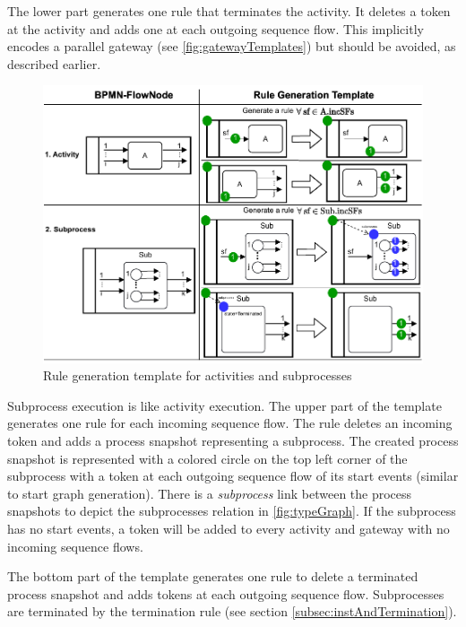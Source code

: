 \documentclass[runningheads]{lmcs}
\begin{document}
The lower part generates one rule that terminates the activity.
It deletes a token at the activity and adds one at each outgoing sequence flow.
This implicitly encodes a parallel gateway (see \autoref{fig:gatewayTemplates}) but should be avoided, as described earlier. 

\begin{figure}[ht]
    \centering
    \includegraphics[width=1\textwidth]{images/activities_template.pdf}
    \caption{Rule generation template for activities and subprocesses}
    \label{fig:activityTemplates}
\end{figure}

Subprocess execution is like activity execution.
The upper part of the template generates one rule for each incoming sequence flow.
The rule deletes an incoming token and adds a process snapshot representing a subprocess. 
The created process snapshot is represented with a colored circle on the top left corner of the subprocess with a token at each outgoing sequence flow of its start events (similar to start graph generation).
There is a \textit{subprocess} link between the process snapshots to depict the \textsf{subprocesses} relation in \autoref{fig:typeGraph}.
If the subprocess has no start events, a token will be added to every activity and gateway with no incoming sequence flows.

The bottom part of the template generates one rule to delete a terminated process snapshot and adds tokens at each outgoing sequence flow.
Subprocesses are terminated by the termination rule (see section \ref{subsec:instAndTermination}).
\end{document}
